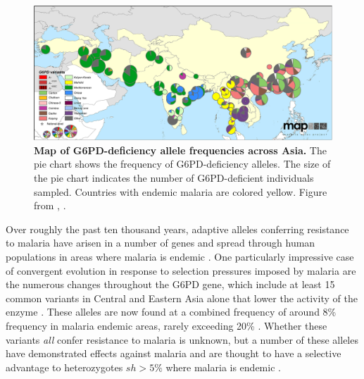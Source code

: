 {\begin{figure}
\begin{center}
  \includegraphics[width=0.9 \textwidth]{Journal_figs/drift_selection/G6PD/G6pd_Howes_et_al_1475-2875-12-418-4.png} 
\caption{ 
{\bf Map of G6PD-deficiency allele frequencies across Asia.} 
The pie chart shows the frequency of G6PD-deficiency alleles. 
The size of the pie chart indicates the number of G6PD-deficient individuals sampled.
Countries with endemic malaria are colored yellow. 
Figure from \citet{Howes-g6pd-variants}, \PLOSccBY.
} \label{fig-G6PD-map}
\end{center}
\end{figure}

Over roughly the past ten thousand years, adaptive alleles conferring resistance to malaria have arisen in a number of genes 
and spread through human populations in areas where malaria is endemic
\citep{Kwiatkowski:05}. One particularly impressive case of convergent evolution in response to
selection pressures imposed by malaria are the numerous changes
throughout the G6PD gene,
which include at least 15 common variants in Central and Eastern Asia alone that lower the activity of the
enzyme \citep{Howes-g6pd-variants}. 
These alleles are now found at a combined frequency of around 8\% frequency in malaria endemic areas,
rarely exceeding 20\% \citep{Howes-g6pd-preval}. Whether these variants {\it all} confer resistance to malaria is unknown,
but a number of these alleles have demonstrated effects against
malaria and are thought to have a selective advantage to heterozygotes $sh > 5\%$ where malaria is endemic \citep{Ruwende-g6pd,tishkoff-g6pd,Louicharoen-g6pd}. 

}
